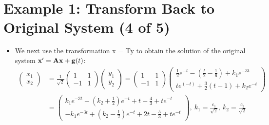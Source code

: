 \documentclass[11pt,a4paper]{article}
\begin{document}
	\section*{Example 1: Transform Back to Original System (4 of 5)}
	\begin{itemize}
		\item We next use the transformation x = Ty to obtain the solution of the original system $\vb{x}^\prime = \vb{Ax} + \vb{g}(t)$:
		\begin{align*}
			\begin{pmatrix}
				x_1\\
				x_2
			\end{pmatrix} &= \frac{1}{\sqrt{2}}
			\begin{pmatrix}
				1 & 1\\
				-1 & 1
			\end{pmatrix}
			\begin{pmatrix}
				y_1\\
				y_2
			\end{pmatrix} =
			\begin{pmatrix}
				1 & 1\\
				-1 & 1
			\end{pmatrix}
			\begin{pmatrix}
				\frac{1}{2}e^{-t}-\left(\frac{t}{2}-\frac{1}{6}\right)+k_1e^{-3t}\\
				te^(-t) + \frac{3}{2}(t-1)+k_2e^{-t}
			\end{pmatrix}\\
			&=
			\begin{pmatrix}
				k_1e^{-3t} + \left(k_2 + \frac{1}{2}\right)e^{-t} + t-\frac{4}{3} + te^{-t}\\
				-k_1e^{-3t} + \left(k_2-\frac{1}{2}\right)e^{-t} + 2t - \frac{5}{3}+te^{-t}
			\end{pmatrix},\ k_1 = \frac{c_1}{\sqrt{2}},\ k_2 = \frac{c_2}{\sqrt{2}}
		\end{align*}
	\end{itemize}
\end{document}
